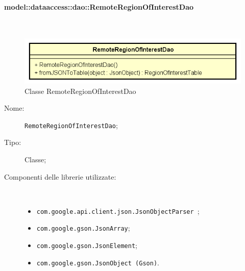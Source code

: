 \documentclass[../DefinizioneDiProdotto.tex]{subfiles}
\begin{document}
\paragraph{model::dataaccess::dao::RemoteRegionOfInterestDao}
\
\begin{figure}[H]
	\centering
	\includegraphics[width=\maxwidth]{img/RemoteRegionOfInterestDao.png}
	\caption{Classe RemoteRegionOfInterestDao}\label{fig:model::dataaccess::dao::RemoteRegionOfInterestDao} 
\end{figure}
\begin{description}
	\item[Nome:] \texttt{RemoteRegionOfInterestDao};
	\item[Tipo:] Classe;
	\item[Componenti delle librerie utilizzate:] \
	\begin{itemize}
		\item \texttt{com.google.api.client.json.JsonObjectParser
		};
		
		\item \texttt{com.google.gson.JsonArray};
		
		\item \texttt{com.google.gson.JsonElement};
		
		\item \texttt{com.google.gson.JsonObject (Gson)}.
		

\end{itemize}
\end{description}
\end{document}
